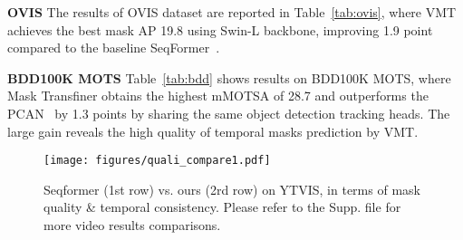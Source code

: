 \documentclass[runningheads]{llncs}
\newcommand{\parsection}[1]{\textbf{#1} }
\begin{document}
\parsection{OVIS}
The results of OVIS dataset are reported in Table~\ref{tab:ovis}, where VMT achieves the best mask AP 19.8 using Swin-L backbone, improving 1.9 point compared to the baseline SeqFormer~\cite{wu2021seqformer}. 

\parsection{BDD100K MOTS}
Table~\ref{tab:bdd} shows results on BDD100K MOTS, where Mask Transfiner obtains the highest mMOTSA of 28.7 and outperforms the PCAN~\cite{pcan} by 1.3 points by sharing the same object detection tracking heads. The large gain reveals the high quality of temporal masks prediction by VMT. 


	\begin{figure}[!t]
	\centering
\texttt{[image: figures/quali\_compare1.pdf]}
\caption{Seqformer (1st row) vs. ours (2rd row) on YTVIS, in terms of mask quality \& temporal consistency. Please refer to the Supp. file for more video results comparisons.}
\label{fig:vis_comp}
\end{figure}
\end{document}

